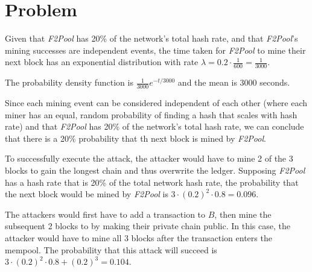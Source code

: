 \documentclass[11pt]{article}
\begin{document}
\section{Problem}

\begin{p}\end{p}
Given that \textit{F2Pool} has 20\% of the network's total hash rate, and that \textit{F2Pool}'s mining successes are independent events, the time taken for \textit{F2Pool} to mine their next block has an exponential distribution with rate $\lambda = 0.2 \cdot \frac{1}{600} = \frac{1}{3000}$.

The probability density function is $\frac{1}{3000}e^{-t/3000}$ and the mean is 3000 seconds.

\begin{p}\end{p}
Since each mining event can be considered independent of each other (where each miner has an equal, random probability of finding a hash that scales with hash rate) and that \textit{F2Pool} has 20\% of the network's total hash rate, we can conclude that there is a 20\% probability that th next block is mined by \textit{F2Pool}.

\begin{p}\end{p}
To successfully execute the attack, the attacker would have to mine 2 of the 3 blocks to gain the longest chain and thus overwrite the ledger. Supposing \textit{F2Pool} has a hash rate that is 20\% of the total network hash rate, the probability that the next block would be mined by \textit{F2Pool} is $3 \cdot (0.2)^2 \cdot 0.8 = 0.096$.

The attackers would first have to add a transaction to $B$, then mine the subsequent 2 blocks to by making their private chain public. In this case, the attacker would have to mine all 3 blocks after the transaction enters the mempool. The probability that this attack will succeed is $3 \cdot (0.2)^2 \cdot 0.8 + (0.2)^3 = 0.104$.



\end{document}
